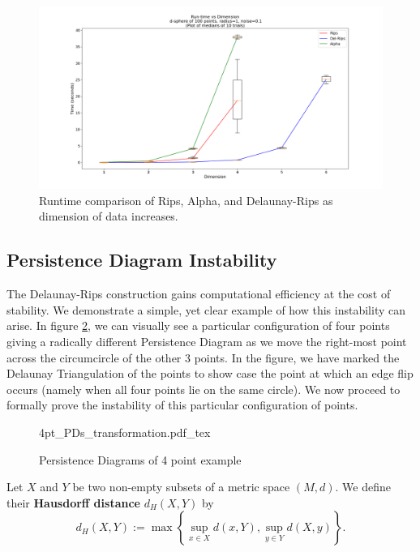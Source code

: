 \documentclass[letterpaper,titlepage]{article}
\newcommand{\incfig}[1]{%
    \def\svgwidth{\columnwidth}
    {#1.pdf_tex}
}
\begin{document}
\begin{figure}[ht]
    \centering
    \includegraphics[width=\columnwidth]{./figures/runtime_dim_60sec_cap_1.png}
    \caption{Runtime comparison of Rips, Alpha, and Delaunay-Rips as dimension of data increases.}
    \label{fig:runtime_dim}
\end{figure}



\subsection{Persistence Diagram Instability}
The Delaunay-Rips construction gains computational efficiency at the cost of stability. We demonstrate a simple, yet clear example of how this instability can arise. In figure \ref{fig:4pt_PDs_transformation}, we can visually see a particular configuration of four points giving a radically different Persistence Diagram as we move the right-most point across the circumcircle of the other 3 points. In the figure, we have marked the Delaunay Triangulation of the points to show case the point at which an edge flip occurs (namely when all four points lie on the same circle). We now proceed to formally prove the instability of this particular configuration of points.

\begin{figure}[ht]
    \centering
    \incfig{4pt_PDs_transformation}
    \caption{Persistence Diagrams of 4 point example}
    \label{fig:4pt_PDs_transformation}
\end{figure}

\begin{defn}
    Let $X$ and $Y$ be two non-empty subsets of a metric space $(M,d)$. We define their \textbf{Hausdorff distance} $d_H(X,Y)$ by
    $$d_H(X,Y):=\max\left\{\sup_{x\in X} d(x,Y), \sup_{y\in Y} d(X,y)\right\}.$$
\end{defn}
\end{document}
